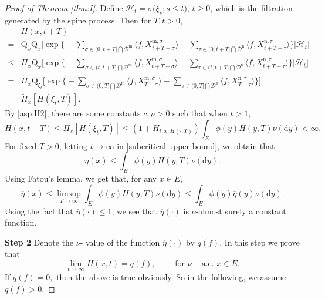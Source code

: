 \documentclass[12pt,a4paper]{amsart}
\numberwithin{equation}{section}
\theoremstyle{plain}
\theoremstyle{definition}
\theoremstyle{remark}
\begin{document}
\begin{proof}[Proof of Theorem \ref{thm:I}]
Define  $\mathcal{H}_t=\sigma\big(\xi_s; s\leq t\big)$, $t\geq 0$, which is  the filtration generated by the spine process.  Then for $T,t>0$,
\begin{equation}\label{subcritical upper bound}
 \begin{aligned}
 &H(x,t+T)\\
 =&\mathrm Q_{x}\mathrm Q_{x}\Big[\exp\Big\{-\sum_{\sigma\in (0, t+T]\bigcap \mathcal D^{\mathrm m}}\langle f, X_{t+T-\sigma}^{{\mathrm m},\sigma}\rangle -\sum_{\tau\in (0, t+T]\bigcap \mathcal D^{\mathrm n}}\langle f, X_{t+T-\tau}^{{\mathrm n}, \tau}\rangle \Big\}\Big| \mathcal H_t\Big]\\
 \leq&\widetilde\Pi_x\mathrm Q_{x}\Big[\exp\Big\{-\sum_{\sigma\in (t, t+T]\bigcap \mathcal D^{\mathrm m}}\langle f, X_{t+T-\sigma}^{{\mathrm m},\sigma}\rangle -\sum_{\tau\in (t, t+T]\bigcap \mathcal D^{\mathrm n}}\langle f, X_{t+T-\tau}^{{\mathrm n}, \tau}\rangle \Big\}\Big| \mathcal H_t\Big]\\
 =&
   \widetilde\Pi_x\mathrm Q_{\xi_t}\Big[\exp\Big\{-\sum_{\sigma\in (0, T]\bigcap \mathcal D^{\mathrm m}}\langle f, X_{T-\sigma}^{{\mathrm m},\sigma}\rangle -\sum_{\tau\in (0, T]\bigcap \mathcal D^{\mathrm n}}\langle f, X_{T-\tau}^{{\mathrm n}, \tau}\rangle \Big\}\Big]\\
 =&\widetilde\Pi_x\left[ H(\xi_t, T)\right].
 \end{aligned}
 \end{equation}
By \eqref{asp:H2}, there are some constants $c,\rho>0$ such that when $t>1$,
\[
 H(x,t+T)\leq \widetilde\Pi_x\left[ H(\xi_t, T)\right]\leq
 (1+H_{t, x, H(\cdot, T)})\int_E\phi(y)H(y,T)\nu(\mathrm dy)<\infty.
 \]
For fixed  $T>0$, letting $t\to \infty$ in \eqref{subcritical upper bound}, we obtain that
\begin{equation}\label{sub super}
\overline\eta(x)\leq \int_E\phi(y)H(y,T)\nu(\mathrm dy).
\end{equation}
   Using Fatou's lemma, we get that, for any $x\in E$,
\begin{equation}\label{sup inequality}
\overline\eta(x)\leq
\limsup_{T\rightarrow\infty}\int_E\phi(y)H(y,T)\nu(\mathrm dy)
\leq \int_E\phi(y)\overline{\eta}(y)\nu(\mathrm dy).
\end{equation}
Using the fact that  $\overline{\eta}(\cdot)\leq 1$,
we see that $\overline\eta(\cdot)$ is $\nu$-almost surely a constant function.

{\bf Step 2}\quad
 Denote the $\nu$- value of the function $\overline\eta(\cdot)$ by $q(f)$.  In this step we prove that
 \begin{equation}\label{limit-H}
 \lim_{t\rightarrow\infty}H(x,t)=q(f),\qquad
 \text{ for } \nu-\text{a.e. }x\in E.
 \end{equation}
If $q(f)= 0,$ then the above is true obviously. So in the
following, we assume $q(f)>0$.


\end{proof}
\end{document}
